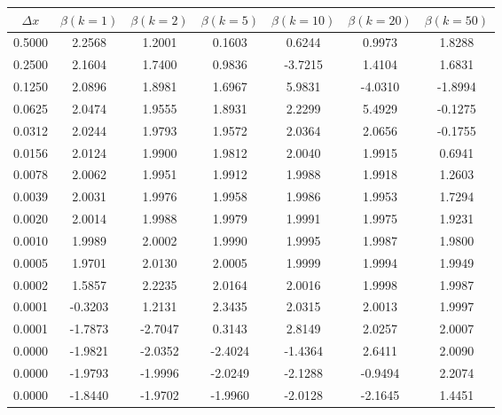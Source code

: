 \begin{tabular}{|c|c|c|c|c|c|c|}
\hline
\textbf{$\Delta x$}&\textbf{$\beta(k=1)$}&\textbf{$\beta(k=2)$}&\textbf{$\beta(k=5)$}&\textbf{$\beta(k=10)$}&\textbf{$\beta(k=20)$}&\textbf{$\beta(k=50)$}\\\hline
0.5000&2.2568&1.2001&0.1603&0.6244&0.9973&1.8288\\\hline
0.2500&2.1604&1.7400&0.9836&-3.7215&1.4104&1.6831\\\hline
0.1250&2.0896&1.8981&1.6967&5.9831&-4.0310&-1.8994\\\hline
0.0625&2.0474&1.9555&1.8931&2.2299&5.4929&-0.1275\\\hline
0.0312&2.0244&1.9793&1.9572&2.0364&2.0656&-0.1755\\\hline
0.0156&2.0124&1.9900&1.9812&2.0040&1.9915&0.6941\\\hline
0.0078&2.0062&1.9951&1.9912&1.9988&1.9918&1.2603\\\hline
0.0039&2.0031&1.9976&1.9958&1.9986&1.9953&1.7294\\\hline
0.0020&2.0014&1.9988&1.9979&1.9991&1.9975&1.9231\\\hline
0.0010&1.9989&2.0002&1.9990&1.9995&1.9987&1.9800\\\hline
0.0005&1.9701&2.0130&2.0005&1.9999&1.9994&1.9949\\\hline
0.0002&1.5857&2.2235&2.0164&2.0016&1.9998&1.9987\\\hline
0.0001&-0.3203&1.2131&2.3435&2.0315&2.0013&1.9997\\\hline
0.0001&-1.7873&-2.7047&0.3143&2.8149&2.0257&2.0007\\\hline
0.0000&-1.9821&-2.0352&-2.4024&-1.4364&2.6411&2.0090\\\hline
0.0000&-1.9793&-1.9996&-2.0249&-2.1288&-0.9494&2.2074\\\hline
0.0000&-1.8440&-1.9702&-1.9960&-2.0128&-2.1645&1.4451\\\hline
\end{tabular}
